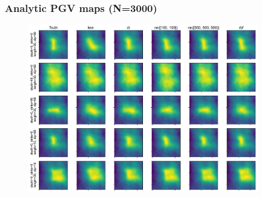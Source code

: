 \documentclass{beamer}
\begin{document}
    \begin{frame}
        \frametitle{Analytic PGV maps (N=3000)}
        \begin{figure}
            \includegraphics[width=0.9\textwidth]{figs/analytic_pgv_maps_3000.pdf}
        \end{figure}
    \end{frame}
\end{document}
